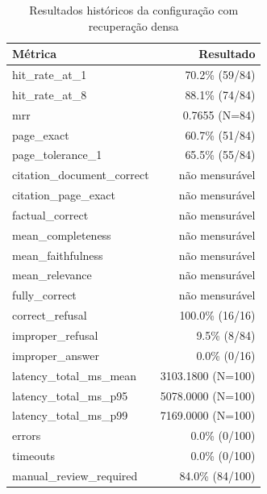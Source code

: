 \begin{table}[htbp]
\centering
\caption{Resultados históricos da configuração com recuperação densa}
\label{tab:avaliacao-rag-densa-historica}
\begin{tabular}{lr}
\hline
Métrica & Resultado \\
\hline
hit\_rate\_at\_1 & 70.2\% (59/84) \\
hit\_rate\_at\_8 & 88.1\% (74/84) \\
mrr & 0.7655 (N=84) \\
page\_exact & 60.7\% (51/84) \\
page\_tolerance\_1 & 65.5\% (55/84) \\
citation\_document\_correct & não mensurável \\
citation\_page\_exact & não mensurável \\
factual\_correct & não mensurável \\
mean\_completeness & não mensurável \\
mean\_faithfulness & não mensurável \\
mean\_relevance & não mensurável \\
fully\_correct & não mensurável \\
correct\_refusal & 100.0\% (16/16) \\
improper\_refusal & 9.5\% (8/84) \\
improper\_answer & 0.0\% (0/16) \\
latency\_total\_ms\_mean & 3103.1800 (N=100) \\
latency\_total\_ms\_p95 & 5078.0000 (N=100) \\
latency\_total\_ms\_p99 & 7169.0000 (N=100) \\
errors & 0.0\% (0/100) \\
timeouts & 0.0\% (0/100) \\
manual\_review\_required & 84.0\% (84/100) \\
\hline
\end{tabular}
\end{table}
